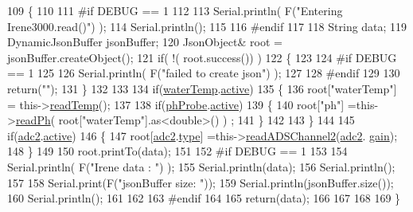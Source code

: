 \begin{DoxyCode}
109 \{
110 
111 \textcolor{preprocessor}{#if DEBUG == 1 }
112     
113     Serial.println( F(\textcolor{stringliteral}{"Entering Irene3000.read()"}) );
114     Serial.println();
115 
116 \textcolor{preprocessor}{#endif }
117 
118     String data;
119     DynamicJsonBuffer jsonBuffer;
120     JsonObject& root = jsonBuffer.createObject();
121     \textcolor{keywordflow}{if}( !( root.success()) )
122     \{
123     
124 \textcolor{preprocessor}{    #if DEBUG == 1 }
125 
126         Serial.println( F(\textcolor{stringliteral}{"failed to create json"}) );
127     
128 \textcolor{preprocessor}{    #endif }
129 
130         \textcolor{keywordflow}{return}(\textcolor{stringliteral}{""});
131     \}
132 
133         
134     \textcolor{keywordflow}{if}(\hyperlink{class_irene3000_af05612c78c758ce9db316c75ad937130}{waterTemp}.\hyperlink{struct_irene3000_1_1state_af7ff649f20b9a2fb6ca0f949ee9a25ce}{active})
135     \{
136         root[\textcolor{stringliteral}{"waterTemp"}] = this->\hyperlink{class_irene3000_a80bc6dfea106dc3bc54fa20204d4d5dc}{readTemp}();
137 
138         \textcolor{keywordflow}{if}(\hyperlink{class_irene3000_a997a4ee466fa1d5416e07e444965dc9e}{phProbe}.\hyperlink{struct_irene3000_1_1state_af7ff649f20b9a2fb6ca0f949ee9a25ce}{active})
139         \{
140             root[\textcolor{stringliteral}{"ph"}] =this->\hyperlink{class_irene3000_a436fc0a06681cd0784aba56b9707f19a}{readPh}( root[\textcolor{stringliteral}{"waterTemp"}].as<double>() ) ;
141         \}
142 
143     \}
144 
145     \textcolor{keywordflow}{if}(\hyperlink{class_irene3000_aae3a95a1c83c766cd2f299ce471c337e}{adc2}.\hyperlink{struct_irene3000_1_1state_af7ff649f20b9a2fb6ca0f949ee9a25ce}{active})
146     \{
147         root[\hyperlink{class_irene3000_aae3a95a1c83c766cd2f299ce471c337e}{adc2}.\hyperlink{struct_irene3000_1_1state_a9897a7e02727db6351d44006eec73799}{type}] =this->\hyperlink{class_irene3000_ae73bd2ed14a199a7e83f4d6458476a7c}{readADSChannel2}(\hyperlink{class_irene3000_aae3a95a1c83c766cd2f299ce471c337e}{adc2}.
      \hyperlink{struct_irene3000_1_1state_a1ecf69d38cb31ecaf6b3602a3f3e93cb}{gain});
148     \}
149     
150     root.printTo(data);
151     
152 \textcolor{preprocessor}{#if DEBUG == 1 }
153 
154     Serial.println( F(\textcolor{stringliteral}{"Irene data : "}) );
155     Serial.println(data);
156     Serial.println();
157 
158     Serial.print(F(\textcolor{stringliteral}{"jsonBuffer size: "}));
159     Serial.println(jsonBuffer.size());
160     Serial.println();
161 
162 
163 \textcolor{preprocessor}{#endif}
164     
165     \textcolor{keywordflow}{return}(data);
166     
167     
168 
169 \}
\end{DoxyCode}
